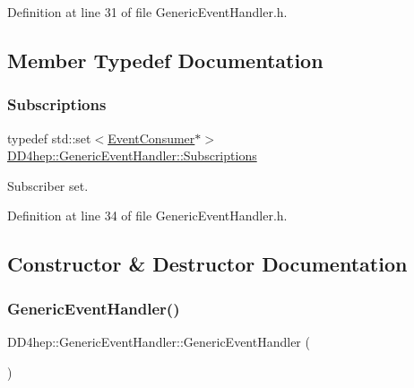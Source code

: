 Definition at line 31 of file Generic\+Event\+Handler.\+h.



\subsection{Member Typedef Documentation}
\hypertarget{class_d_d4hep_1_1_generic_event_handler_a4b7fd1ba9fc0adab2fa1885162e69076}{}\label{class_d_d4hep_1_1_generic_event_handler_a4b7fd1ba9fc0adab2fa1885162e69076} 
\subsubsection{\texorpdfstring{Subscriptions}{Subscriptions}}
{\footnotesize\ttfamily typedef std\+::set$<$\hyperlink{class_d_d4hep_1_1_event_consumer}{Event\+Consumer}$\ast$$>$ \hyperlink{class_d_d4hep_1_1_generic_event_handler_a4b7fd1ba9fc0adab2fa1885162e69076}{D\+D4hep\+::\+Generic\+Event\+Handler\+::\+Subscriptions}\hspace{0.3cm}{\ttfamily [protected]}}



Subscriber set. 



Definition at line 34 of file Generic\+Event\+Handler.\+h.



\subsection{Constructor \& Destructor Documentation}
\hypertarget{class_d_d4hep_1_1_generic_event_handler_aef493617474019a953be658fdec60edc}{}\label{class_d_d4hep_1_1_generic_event_handler_aef493617474019a953be658fdec60edc} 
\subsubsection{\texorpdfstring{Generic\+Event\+Handler()}{GenericEventHandler()}}
{\footnotesize\ttfamily D\+D4hep\+::\+Generic\+Event\+Handler\+::\+Generic\+Event\+Handler (\begin{DoxyParamCaption}{ }\end{DoxyParamCaption})}



